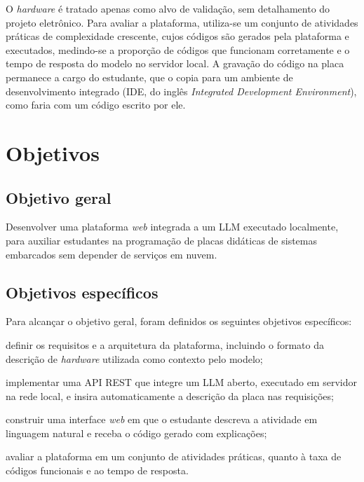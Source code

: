 O \textit{hardware} é tratado apenas como alvo de validação, sem detalhamento do projeto eletrônico. Para avaliar a plataforma, utiliza-se um conjunto de atividades práticas de complexidade crescente, cujos códigos são gerados pela plataforma e executados, medindo-se a proporção de códigos que funcionam corretamente e o tempo de resposta do modelo no servidor local. A gravação do código na placa permanece a cargo do estudante, que o copia para um ambiente de desenvolvimento integrado (IDE, do inglês \textit{Integrated Development Environment}), como faria com um código escrito por ele.

\section{Objetivos}
\label{sec:objectives}

\subsection{Objetivo geral}
\label{subsec:general-objective}

Desenvolver uma plataforma \textit{web} integrada a um LLM executado localmente, para auxiliar estudantes na programação de placas didáticas de sistemas embarcados sem depender de serviços em nuvem.

\subsection{Objetivos específicos}
\label{subsec:specific-objectives}

Para alcançar o objetivo geral, foram definidos os seguintes objetivos específicos:

\begin{alineas}
  \item definir os requisitos e a arquitetura da plataforma, incluindo o formato da descrição de \textit{hardware} utilizada como contexto pelo modelo;
  \item implementar uma API REST que integre um LLM aberto, executado em servidor na rede local, e insira automaticamente a descrição da placa nas requisições;
  \item construir uma interface \textit{web} em que o estudante descreva a atividade em linguagem natural e receba o código gerado com explicações;
  \item avaliar a plataforma em um conjunto de atividades práticas, quanto à taxa de códigos funcionais e ao tempo de resposta.
\end{alineas}

